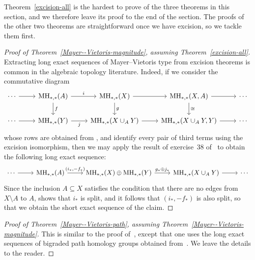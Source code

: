 \documentclass[a4paper, 11 pt, oneside, reqno]{amsart}
\numberwithin{lemma}{section}
\theoremstyle{definition}
\newcommand{\MH}{\mathrm{MH}}
\begin{document}
Theorem~\ref{excision-all} is the hardest to prove of the three 
theorems in this section, and we therefore leave its
proof to the end of the section.
The proofs of the other two theorems are 
straightforward once we have excision, so we tackle them first.

\begin{proof}[Proof of Theorem~\ref{Mayer--Vietoris-magnitude},
assuming Theorem~\ref{excision-all}]
    Extracting long exact sequences of Mayer--Vietoris type 
    from excision theorems
    is common in the algebraic topology literature.
    Indeed, if we consider the commutative diagram 
    \[
    \begin{tikzcd}
        \cdots
        \arrow{r}{}
        &
        \MH_{\ast,\ast}(A)
        \arrow{r}{i}
        \arrow{d}{f}
        &
        \MH_{\ast,\ast}(X)
        \arrow{r}{}
        \arrow{d}{g}
        &
        \MH_{\ast,\ast}(X,A)
        \arrow{r}{}
        \arrow{d}{\cong}
        &
        \cdots
        \\
        \cdots
        \arrow{r}{}
        &
        \MH_{\ast,\ast}(Y)
        \arrow[swap]{r}{j}
        &
        \MH_{\ast,\ast}(X\cup_A Y)
        \arrow{r}{}
        &
        \MH_{\ast,\ast}(X\cup_A Y,Y)
        \arrow{r}{}
        &
        \cdots
    \end{tikzcd}
    \]
    whose rows are obtained from ,
    and identify every pair of third terms using the excision 
    isomorphism, 
    then we may apply the result of exercise~38 of~\cite[p.159]{Hatcher}
    to obtain the following long exact sequence:
    \[
    \begin{tikzcd}
        \cdots
        \arrow{r}{}
        &
        \MH_{\ast,\ast}(A)
        \arrow{r}{(i_\ast,-f_\ast)}
        &
        \MH_{\ast,\ast}(X)
        \oplus
        \MH_{\ast,\ast}(Y)
        \arrow{r}{g_\ast\oplus j_\ast}
        &
        \MH_{\ast,\ast}(X\cup_A Y)
        \arrow{r}{}
        &
        \cdots
    \end{tikzcd}
    \]
    Since the inclusion $A\subseteq X$ satisfies the condition
    that there are no edges from $X\setminus A$ to $A$,
     shows that $i_\ast$ is split, 
    and it follows that $(i_\ast,-f_\ast)$ is also split,
    so that we obtain the short exact sequence of the claim.
\end{proof}

\begin{proof}[Proof of Theorem~\ref{Mayer--Vietoris-path},
assuming Theorem~\ref{Mayer--Vietoris-magnitude}]
    This is similar to the proof of~,
    except that one uses the long exact sequences 
    of bigraded path homology groups obtained from~.
    We leave the details to the reader.
\end{proof}
\end{document}
